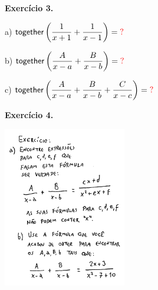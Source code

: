 \documentclass[oneside,12pt]{article}
\begin{document}
%

\newpage


{\bf Exercício 3.}

\msk

a) $\D \togetherp{\frac{1}{x+1} + \frac{1}{x-1}} = \ColorRed{?}$ 

\ssk

b) $\D \togetherp{\frac{A}{x-a} + \frac{B}{x-b}} = \ColorRed{?}$ 

\ssk

c) $\D \togetherp{\frac{A}{x-a} + \frac{B}{x-b} + \frac{C}{x-c}} = \ColorRed{?}$ 


\newpage


{\bf Exercício 4.}

\includegraphics[height=7cm]{2020-1-C2/20201112_C2_fracoes_parciais_4.pdf}

\newpage
\end{document}
